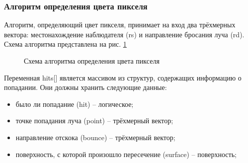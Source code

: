 \documentclass[a4paper, 14pt]{report} %
\begin{document}
	\subsubsection{Алгоритм определения цвета пикселя}
	Алгоритм, определяющий цвет пикселя, принимает на вход два трёхмерных вектора: местонахождение наблюдателя (rs) и направление бросания луча (rd). Схема алгоритма представлена на рис. \ref{fig:calculate_pixel_color}
	\begin{figure}[!ht]
		\caption{Схема алгоритма определения цвета пикселя}
		\label{fig:calculate_pixel_color}
	\end{figure}

	Переменная hits[] является массивом из структур, содержащих информацию о попадании. Они должны хранить следующие данные:
	\begin{itemize}
		\item было ли попадание (hit) – логическое;
		\item точке попадания луча (point) – трёхмерный вектор;
		\item направление отскока (bounce) – трёхмерный вектор;
		\item поверхность, с которой произошло пересечение (surface) – поверхность;
	\end{itemize}
\end{document}
